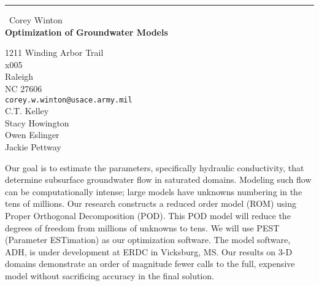 \documentclass{report}
\begin{document}
\begin{center}
\rule{6in}{1pt} \
{\large Corey Winton \\
{\bf Optimization of Groundwater Models}}

1211 Winding Arbor Trail \\ x005 \\ Raleigh \\ NC 27606
\\
{\tt corey.w.winton@usace.army.mil}\\
C.T. Kelley\\
Stacy Howington\\
Owen Eslinger\\
Jackie Pettway\end{center}

Our goal is to estimate the parameters, specifically hydraulic
conductivity, that determine subsurface groundwater flow in saturated
domains. Modeling such flow can be computationally intense; large models
have unknowns numbering in the tens of millions. Our research constructs
a reduced order model (ROM) using Proper Orthogonal Decomposition (POD).
This POD model will reduce the degrees of freedom from millions of
unknowns to tens. We will use PEST (Parameter ESTimation) as our
optimization software. The model software, ADH, is under development at
ERDC in Vicksburg, MS. Our results on 3-D domains demonstrate an order of
magnitude fewer calls to the full, expensive model without sacrificing
accuracy in the final solution.
\end{document}
